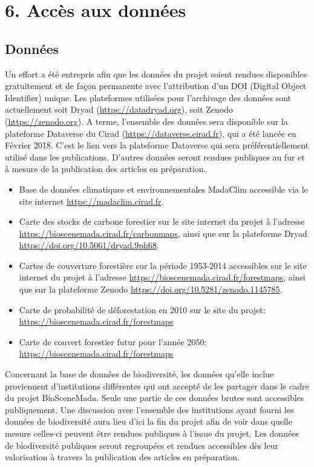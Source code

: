 \documentclass[12pt,]{article}
\providecommand{\tightlist}{%
  \setlength{\itemsep}{0pt}\setlength{\parskip}{0pt}}
\begin{document}
\hypertarget{acces-aux-donnees}{%
\section{6. Accès aux données}\label{acces-aux-donnees}}

\hypertarget{donnees}{%
\subsection{Données}\label{donnees}}

Un effort a été entrepris afin que les données du projet soient rendues
disponibles gratuitement et de façon permanente avec l'attribution d'un
DOI (Digital Object Identifier) unique. Les plateformes utilisées pour
l'archivage des données sont actuellement soit Dryad
(\url{https://datadryad.org}), soit Zenodo (\url{https://zenodo.org}). A
terme, l'ensemble des données sera disponible sur la plateforme
Dataverse du Cirad (\url{https://dataverse.cirad.fr}), qui a été lancée
en Février 2018. C'est le lien vers la plateforme Dataverse qui sera
préférentiellement utilisé dans les publications. D'autres données
seront rendues publiques au fur et à mesure de la publication des
articles en préparation.

\begin{itemize}
\tightlist
\item
  Base de données climatiques et environnementales MadaClim accessible
  via le site internet \url{https://madaclim.cirad.fr}.
\item
  Carte des stocks de carbone forestier sur le site internet du projet à
  l'adresse \url{https://bioscenemada.cirad.fr/carbonmaps}, ainsi que
  sur la plateforme Dryad \url{https://doi.org/10.5061/dryad.9ph68}.
\item
  Cartes de couverture forestière sur la période 1953-2014 accessibles
  sur le site internet du projet à l'adresse
  \url{https://bioscenemada.cirad.fr/forestmaps}, ainsi que sur la
  plateforme Zenodo \url{https://doi.org/10.5281/zenodo.1145785}.
\item
  Carte de probabilité de déforestation en 2010 sur le site du projet:
  \url{https://bioscenemada.cirad.fr/forestmaps}
\item
  Carte de couvert forestier futur pour l'année 2050:
  \url{https://bioscenemada.cirad.fr/forestmaps}
\end{itemize}

Concernant la base de données de biodiversité, les données qu'elle
inclue proviennent d'institutions différentes qui ont accepté de les
partager dans le cadre du projet BioSceneMada. Seule une partie de ces
données brutes sont accessibles publiquement. Une discussion avec
l'ensemble des institutions ayant fourni les données de biodiversité
aura lieu d'ici la fin du projet afin de voir dans quelle mesure
celles-ci peuvent être rendues publiques à l'issue du projet. Les
données de biodiversité publiques seront regroupées et rendues
accessibles dès leur valorisation à travers la publication des articles
en préparation.
\end{document}
